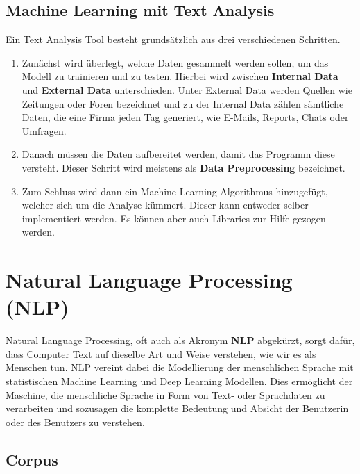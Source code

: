 \subsection{Machine Learning mit Text Analysis}\label{subsec:machine-learning-with-text-analysis}

Ein Text Analysis Tool besteht grundsätzlich aus drei verschiedenen Schritten.

\begin{enumerate}
    \item Zunächst wird überlegt, welche Daten gesammelt werden sollen, um das Modell zu trainieren und zu testen.
    Hierbei wird zwischen \textbf{Internal Data} und \textbf{External Data} unterschieden.
    Unter External Data werden Quellen wie Zeitungen oder Foren bezeichnet und zu der Internal Data zählen sämtliche Daten, die eine Firma jeden Tag generiert, wie E-Mails, Reports, Chats oder Umfragen.
    \item Danach müssen die Daten aufbereitet werden, damit das Programm diese versteht.
    Dieser Schritt wird meistens als \textbf{Data Preprocessing} bezeichnet.
    \item Zum Schluss wird dann ein Machine Learning Algorithmus hinzugefügt, welcher sich um die Analyse kümmert.
Dieser kann entweder selber implementiert werden.
Es können aber auch Libraries zur Hilfe gezogen werden.\cite{machineLearningTextAnalysis}
\end{enumerate}

\section{Natural Language Processing (NLP)}\label{sec:natural-language-processing}

Natural Language Processing, oft auch als Akronym \textbf{NLP} abgekürzt, sorgt dafür, dass Computer Text auf dieselbe Art und Weise verstehen, wie wir es als Menschen tun.
NLP vereint dabei die Modellierung der menschlichen Sprache mit statistischen Machine Learning und Deep Learning Modellen.
Dies ermöglicht der Maschine, die menschliche Sprache in Form von Text- oder Sprachdaten zu verarbeiten und sozusagen die komplette Bedeutung und Absicht der Benutzerin oder des Benutzers zu verstehen.\cite{naturalLanguageProcessingIBM}

\subsection{Corpus}\label{subsec:corpus}

